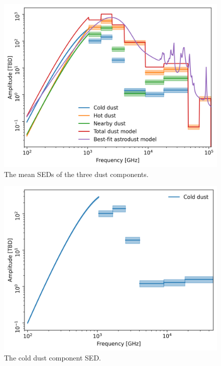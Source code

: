 \documentclass{aa}
\begin{document}
\begin{figure}
  \centering
  \includegraphics[width=\columnwidth]{figures/all_components_sed.png}
  \caption{The mean SEDs of the three dust components.}
  \label{fig:all_components_sed}
\end{figure}
\begin{figure}
  \centering
  \includegraphics[width=\columnwidth]{figures/cold_dust_sed.png}
  \caption{The cold dust component SED.}
  \label{fig:cold_dust_sed}
\end{figure}
\end{document}
